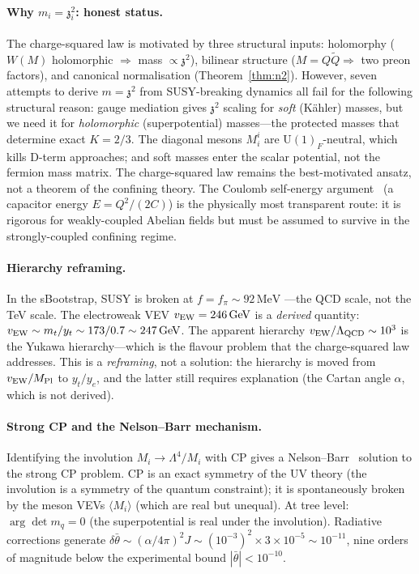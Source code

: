 \documentclass[aps,prd,twocolumn,showpacs,preprintnumbers,superscriptaddress,floatfix]{revtex4-2}
\newcommand{\UU}{\mathrm{U}}
\newcommand{\MeV}{\,\mathrm{MeV}}
\newcommand{\GeV}{\,\mathrm{GeV}}
\newcommand{\zch}{\mathfrak{z}}
\begin{document}
\paragraph{Why $m_i = \zch_i^2$: honest status.}
The charge-squared law is motivated by three structural inputs:
holomorphy ($W(M)$ holomorphic $\Rightarrow$ mass
$\propto \zch^2$), bilinear structure ($M = Q\tilde{Q}
\Rightarrow$ two preon factors), and canonical normalisation
(Theorem~\ref{thm:n2}).
However, seven attempts to derive $m = \zch^2$ from SUSY-breaking
dynamics all fail for the following structural reason: gauge
mediation gives $\zch^2$ scaling for \emph{soft} (K\"ahler)
masses, but we need it for \emph{holomorphic} (superpotential)
masses---the protected masses that determine exact $K = 2/3$.
The diagonal mesons $M^i_i$ are $\UU(1)_F$-neutral, which kills
D-term approaches; and soft masses enter the scalar potential,
not the fermion mass matrix.
The charge-squared law remains the best-motivated ansatz, not a
theorem of the confining theory.
The Coulomb self-energy argument~\cite{Koide:1983qe} (a capacitor
energy $E = Q^2/(2C)$) is the physically most transparent route:
it is rigorous for weakly-coupled Abelian fields but must be
assumed to survive in the strongly-coupled confining regime.

\paragraph{Hierarchy reframing.}
In the sBootstrap, SUSY is broken at $f = f_\pi \sim 92\MeV$
---the QCD scale, not the TeV scale.
The electroweak VEV $v_{\rm EW} = 246\GeV$ is a \emph{derived}
quantity: $v_{\rm EW} \sim m_t / y_t \sim 173/0.7 \sim 247\GeV$.
The apparent hierarchy $v_{\rm EW}/\Lambda_{\rm QCD} \sim 10^3$
is the Yukawa hierarchy---which is the flavour problem that
the charge-squared law addresses.
This is a \emph{reframing}, not a solution: the hierarchy is
moved from $v_{\rm EW}/M_{\rm Pl}$ to $y_t/y_e$, and the latter
still requires explanation (the Cartan angle $\alpha$, which is
not derived).

\paragraph{Strong CP and the Nelson--Barr mechanism.}
Identifying the involution $M_i \to \Lambda^4/M_i$ with CP
gives a Nelson--Barr~\cite{Nelson:1984,Barr:1984} solution to
the strong CP problem.
CP is an exact symmetry of the UV theory (the involution is a
symmetry of the quantum constraint); it is spontaneously broken
by the meson VEVs $\langle M_i\rangle$ (which are real but
unequal).
At tree level: $\arg\det m_q = 0$ (the superpotential is real
under the involution).
Radiative corrections generate
$\delta\bar\theta \sim (\alpha/4\pi)^2 J \sim (10^{-3})^2
\times 3 \times 10^{-5} \sim 10^{-11}$,
nine orders of magnitude below the experimental bound
$|\bar\theta| < 10^{-10}$.
\end{document}
